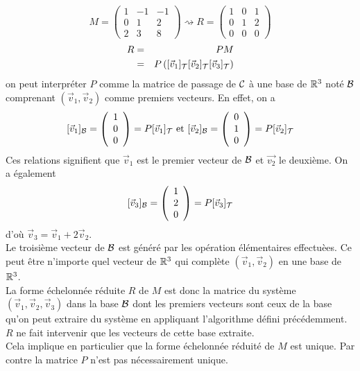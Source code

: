$$M = \begin{pmatrix} 
  1 & -1 & -1 \\
  0 & 1 & 2  \\
  2 & 3 & 8
\end{pmatrix}
\rightsquigarrow  
R = \begin{pmatrix}
  1 & 0 & 1 \\
  0 & 1 & 2 \\
  0 & 0 & 0
\end{pmatrix}$$
\begin{eqnarray*}
  R &=& P M \\
    &=& P \left([\vec{v}_1]_{\mathcal{T}} [\vec{v}_2]_{\mathcal{T}} [\vec{v}_3]_{\mathcal{T}}\right)
\end{eqnarray*}
on peut interpréter $P$ comme la matrice de passage de $\mathcal{C}$ à une base de $\mathbb{R}^3$ noté $\mathcal{B}$ comprenant $(\vec{v}_1, \vec{v}_2)$ comme premiers vecteurs. En effet, on a
$$[\vec{v}_1]_{\mathcal{B}} = \left( \begin{array}{c} 1 \\ 0 \\ 0 \end{array} \right) = P[\vec{v}_1]_{\mathcal{T}} \text{ et } 
  [\vec{v}_2]_{\mathcal{B}} = \left( \begin{array}{c} 0 \\ 1 \\ 0 \end{array} \right) = P[\vec{v}_2]_{\mathcal{T}}$$
Ces relations signifient que $\vec{v}_1$ est le premier vecteur de $\mathcal{B}$ et $\vec{v_2}$ le deuxième. On a également
$$[\vec{v}_3]_{\mathcal{B}} = \left( \begin{array}{c} 1 \\ 2 \\ 0 \end{array}\right) = P [\vec{v}_3]_{\mathcal{T}}$$
d'où $\vec{v}_3 = \vec{v}_1 + 2 \vec{v}_2$. \\
Le troisième vecteur de $\mathcal{B}$ est généré par les opération élémentaires effectuèes. Ce peut être n'importe quel vecteur de $\mathbb{R}^3$ qui complète $(\vec{v}_1, \vec{v}_2)$ en une base de $\mathbb{R}^3$. \\
La forme échelonnée réduite $R$ de $M$ est donc la matrice du système $(\vec{v}_1, \vec{v}_2, \vec{v}_3)$ dans la base $\mathcal{B}$ dont les premiers vecteurs sont ceux de la base qu'on peut extraire du système en appliquant l'algorithme défini précédemment. $R$ ne fait intervenir que les vecteurs de cette base extraite. \\
Cela implique en particulier que la forme échelonnée réduité de $M$ est unique. Par contre la matrice $P$ n'est pas nécessairement unique.

